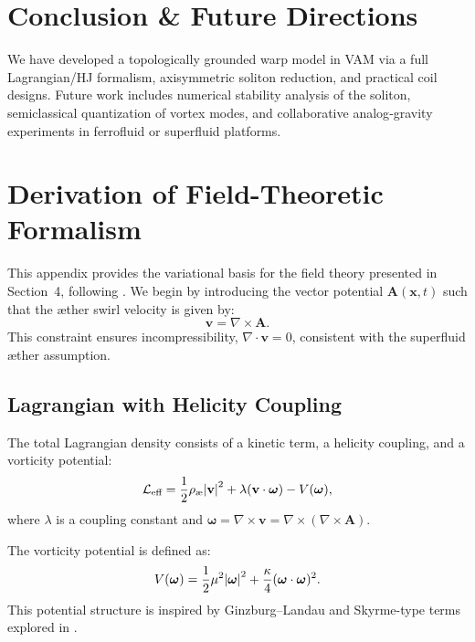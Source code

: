 \documentclass[preprint,notitlepage]{revtex4-2}
\begin{document}
\section{Conclusion \& Future Directions}
    We have developed a topologically grounded warp model in VAM via a full Lagrangian/HJ formalism, axisymmetric soliton reduction, and practical coil designs. Future work includes numerical stability analysis of the soliton, semiclassical quantization of vortex modes, and collaborative analog‐gravity experiments in ferrofluid or superfluid platforms.




\appendix
    \section{Derivation of Field-Theoretic Formalism}\label{sec:field_theory}
    
    This appendix provides the variational basis for the field theory presented in Section~4, following \cite{VAM1, VAM2, VAM4}. We begin by introducing the vector potential $\mathbf{A}(\mathbf{x},t)$ such that the æther swirl velocity is given by:
    \begin{equation}
    \mathbf{v} = \nabla \times \mathbf{A}.
    \end{equation}
    This constraint ensures incompressibility, $\nabla \cdot \mathbf{v} = 0$, consistent with the superfluid æther assumption.
    
    \subsection*{Lagrangian with Helicity Coupling}
    The total Lagrangian density consists of a kinetic term, a helicity coupling, and a vorticity potential:
    \begin{equation}
    \mathcal{L}_{\text{eff}} = \frac{1}{2} \rho_{\text{\ae}} \abs{\mathbf{v}}^2 + \lambda (\mathbf{v} \cdot \boldsymbol{\omega}) - V(\boldsymbol{\omega}),
    \end{equation}
    where $\lambda$ is a coupling constant and $\boldsymbol{\omega} = \nabla \times \mathbf{v} = \nabla \times (\nabla \times \mathbf{A})$.
    
    The vorticity potential is defined as:
    \begin{equation}
    V(\boldsymbol{\omega}) = \frac{1}{2} \mu^2 \abs{\boldsymbol{\omega}}^2 + \frac{\kappa}{4} (\boldsymbol{\omega} \cdot \boldsymbol{\omega})^2.
    \end{equation}
    This potential structure is inspired by Ginzburg–Landau and Skyrme-type terms explored in \cite{VAM2, VAM10}.
    
\end{document}

